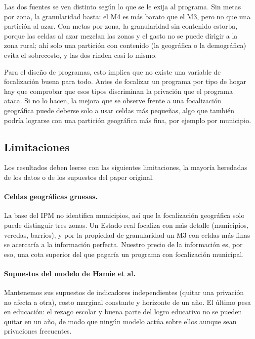 Las dos fuentes se ven distinto según lo que se le exija al programa. Sin
metas por zona, la granularidad basta: el M4 es más barato que el M3, pero no
que una partición al azar. Con metas por zona, la granularidad sin contenido
estorba, porque las celdas al azar mezclan las zonas y el gasto no se puede
dirigir a la zona rural; ahí solo una partición con contenido (la geográfica o
la demográfica) evita el sobrecosto, y las dos rinden casi lo mismo.

Para el diseño de programas, esto implica que no existe una variable de
focalización buena para todo. Antes de focalizar un programa por tipo de hogar
hay que comprobar que esos tipos discriminan la privación que el programa
ataca. Si no lo hacen, la mejora que se observe frente a una focalización
geográfica puede deberse solo a usar celdas más pequeñas, algo que
también podría lograrse con una partición geográfica más fina, por ejemplo por
municipio.

\subsection{Limitaciones}

Los resultados deben leerse con las siguientes limitaciones, la mayoría heredadas
de los datos o de los supuestos del paper original.

\paragraph{Celdas geográficas gruesas.} La base del IPM no identifica municipios,
así que la focalización geográfica solo puede distinguir tres zonas. Un Estado
real focaliza con más detalle (municipios, veredas, barrios), y por la propiedad
de granularidad un M3 con celdas más finas se acercaría a la información perfecta.
Nuestro precio de la información es, por eso, una cota superior del que pagaría un
programa con focalización municipal.

\paragraph{Supuestos del modelo de Hamie et al.} Mantenemos sus supuestos de
indicadores independientes (quitar una privación no afecta a otra), costo marginal
constante y horizonte de un año. El último pesa en educación: el rezago escolar y
buena parte del logro educativo no se pueden quitar en un año, de modo que ningún
modelo actúa sobre ellos aunque sean privaciones frecuentes.

